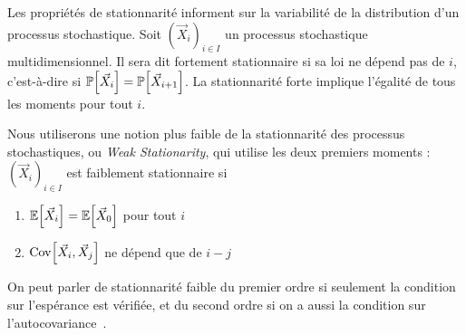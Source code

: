 
Les propriétés de stationnarité informent sur la variabilité de la distribution d'un processus stochastique. Soit $(\vec{X}_i)_{i\in I}$ un processus stochastique multidimensionnel. Il sera dit fortement stationnaire si sa loi ne dépend pas de $i$, c'est-à-dire si $\operatorname{\mathbb{P}}\!\left[\vec{X}_i\right] = \operatorname{\mathbb{P}}\!\left[\vec{X}_{i+1}\right]$. La stationnarité forte implique l'égalité de tous les moments pour tout $i$.

Nous utiliserons une notion plus faible de la stationnarité des processus stochastiques, ou \emph{Weak Stationarity}, qui utilise les deux premiers moments : $(\vec{X}_i)_{i\in I}$ est faiblement stationnaire si
\begin{enumerate}
	\item $\operatorname{\mathbb{E}}\!\left[\vec{X}_i\right] = \operatorname{\mathbb{E}}\!\left[\vec{X}_0\right]$ pour tout $i$
	\item $\operatorname{Cov}\!\left[\vec{X}_i,\vec{X}_j\right]$ ne dépend que de $i-j$
\end{enumerate}
On peut parler de stationnarité faible du premier ordre si seulement la condition sur l'espérance est vérifiée, et du second ordre si on a aussi la condition sur l'autocovariance~\cite{zhang2014test}.









